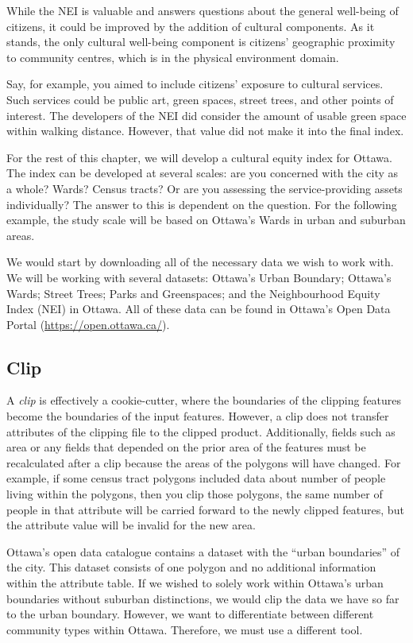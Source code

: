 \documentclass[
]{book}
\begin{document}
While the NEI is valuable and answers questions about the general well-being of citizens, it could be improved by the addition of cultural components. As it stands, the only cultural well-being component is citizens' geographic proximity to community centres, which is in the physical environment domain.

Say, for example, you aimed to include citizens' exposure to cultural services. Such services could be public art, green spaces, street trees, and other points of interest. The developers of the NEI did consider the amount of usable green space within walking distance. However, that value did not make it into the final index.

For the rest of this chapter, we will develop a cultural equity index for Ottawa. The index can be developed at several scales: are you concerned with the city as a whole? Wards? Census tracts? Or are you assessing the service-providing assets individually? The answer to this is dependent on the question. For the following example, the study scale will be based on Ottawa's Wards in urban and suburban areas.

We would start by downloading all of the necessary data we wish to work with. We will be working with several datasets: Ottawa's Urban Boundary; Ottawa's Wards; Street Trees; Parks and Greenspaces; and the Neighbourhood Equity Index (NEI) in Ottawa. All of these data can be found in Ottawa's Open Data Portal (\url{https://open.ottawa.ca/}).

\hypertarget{clip}{%
\subsection{Clip}\label{clip}}

A \emph{clip} is effectively a cookie-cutter, where the boundaries of the clipping features become the boundaries of the input features. However, a clip does not transfer attributes of the clipping file to the clipped product. Additionally, fields such as area or any fields that depended on the prior area of the features must be recalculated after a clip because the areas of the polygons will have changed. For example, if some census tract polygons included data about number of people living within the polygons, then you clip those polygons, the same number of people in that attribute will be carried forward to the newly clipped features, but the attribute value will be invalid for the new area.

Ottawa's open data catalogue contains a dataset with the ``urban boundaries'' of the city. This dataset consists of one polygon and no additional information within the attribute table. If we wished to solely work within Ottawa's urban boundaries without suburban distinctions, we would clip the data we have so far to the urban boundary. However, we want to differentiate between different community types within Ottawa. Therefore, we must use a different tool.
\end{document}
